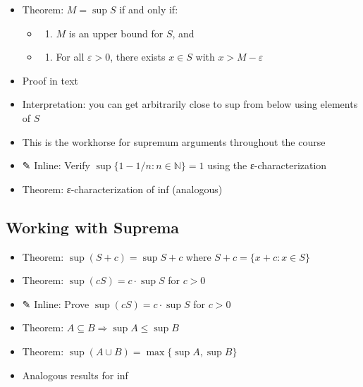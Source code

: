 \documentclass[
  10pt,
  letterpaper,
]{scrbook}
\providecommand{\tightlist}{%
  \setlength{\itemsep}{0pt}\setlength{\parskip}{0pt}}
\newcommand{\NN}{\mathbb{N}}
\begin{document}
\begin{itemize}
\tightlist
\item
  Theorem: \(M = \sup S\) if and only if:

  \begin{itemize}
  \tightlist
  \item
    \begin{enumerate}
    \def\labelenumi{(\arabic{enumi})}
    \tightlist
    \item
      \(M\) is an upper bound for \(S\), and
    \end{enumerate}
  \item
    \begin{enumerate}
    \def\labelenumi{(\arabic{enumi})}
    \setcounter{enumi}{1}
    \tightlist
    \item
      For all \(\varepsilon > 0\), there exists \(x \in S\) with
      \(x > M - \varepsilon\)
    \end{enumerate}
  \end{itemize}
\item
  Proof in text
\item
  Interpretation: you can get arbitrarily close to sup from below using
  elements of \(S\)
\item
  This is the workhorse for supremum arguments throughout the course
\item
  ✎ Inline: Verify \(\sup\{1 - 1/n : n \in \NN\} = 1\) using the
  ε-characterization
\item
  Theorem: ε-characterization of inf (analogous)
\end{itemize}

\subsection{Working with Suprema}\label{working-with-suprema}

\begin{itemize}
\tightlist
\item
  Theorem: \(\sup(S + c) = \sup S + c\) where
  \(S + c = \{x + c : x \in S\}\)
\item
  Theorem: \(\sup(cS) = c \cdot \sup S\) for \(c > 0\)
\item
  ✎ Inline: Prove \(\sup(cS) = c \cdot \sup S\) for \(c > 0\)
\item
  Theorem: \(A \subseteq B \Rightarrow \sup A \leq \sup B\)
\item
  Theorem: \(\sup(A \cup B) = \max\{\sup A, \sup B\}\)
\item
  Analogous results for inf
\end{itemize}
\end{document}
